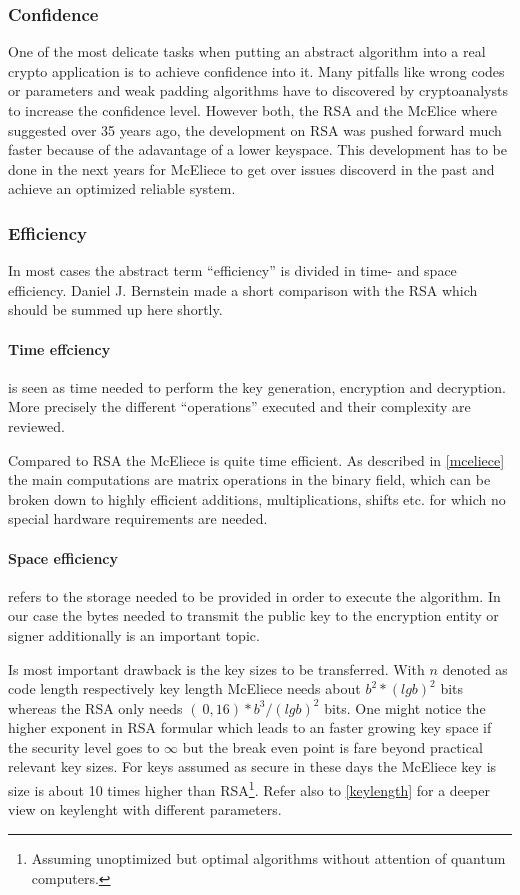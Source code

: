 \subsubsection*{Confidence}
\label{confidence}
One of the most delicate tasks when putting an abstract algorithm into a real crypto application is to achieve confidence into it. Many pitfalls like wrong codes or parameters and weak padding algorithms have to discovered by cryptoanalysts to increase the confidence level. However both, the RSA and the McElice where suggested over 35 years ago, the development on RSA was pushed forward much faster because of the adavantage of a lower keyspace. This development has to be done in the next years for McEliece to get over issues discoverd in the past and achieve an optimized reliable system. 

\subsubsection*{Efficiency}
In most cases the abstract term ``efficiency'' is divided in time- and space efficiency. Daniel J. Bernstein made \cite{bernstein2009introduction} a short comparison with the RSA which should be summed up here shortly. 

\paragraph*{Time effciency} is seen as time needed to perform the key generation, encryption and decryption. More precisely the different ``operations'' executed and their complexity are reviewed. 

Compared to RSA the McEliece is quite time efficient. As described in \autoref{mceliece} the main computations are matrix operations in the binary field, which can be broken down to highly efficient additions, multiplications, shifts etc. for which no special hardware requirements are needed\cite{bernstein2009introduction}.

\paragraph*{Space efficiency} \label{space_efficiency} refers to the storage needed to be provided in order to execute the algorithm. In our case the bytes needed to transmit the public key to the encryption entity or signer additionally is an important topic. 

Is most important drawback is the key sizes to be transferred. With $n$ denoted as code length respectively key length McEliece needs about $b^2*(lg b)^2$ bits whereas the RSA only needs $(~0,16)*b^3/(lg b)^2$ bits. One might notice the higher exponent in RSA formular which leads to an faster growing key space if the security level goes to $\infty$ but the break even point  is fare beyond practical relevant key sizes. For keys assumed as secure in these days the McEliece key is size is about 10 times higher than RSA\footnote{Assuming unoptimized but optimal algorithms without attention of quantum computers.}. Refer also to \autoref{keylength} for a deeper view on keylenght with different parameters.

